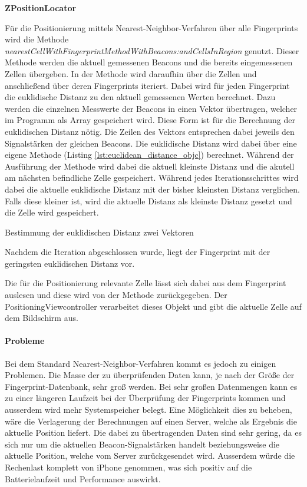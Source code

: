 \textbf{ZPositionLocator}

Für die Positionierung mittels Nearest-Neighbor-Verfahren über alle Fingerprints wird die Methode \emph{nearestCellWithFingerprintMethodWithBeacons:andCellsInRegion} genutzt.
Dieser Methode werden die aktuell gemessenen Beacons und die bereits eingemessenen Zellen übergeben. 
In der Methode wird daraufhin über die Zellen und anschließend über deren Fingerprints iteriert. Dabei wird für jeden Fingerprint die euklidische Distanz zu den aktuell gemessenen Werten berechnet. Dazu werden die einzelnen Messwerte der Beacons in einen Vektor übertragen, welcher im Programm als Array gespeichert wird. Diese Form ist für die Berechnung der euklidischen Distanz nötig. 
Die Zeilen des Vektors entsprechen dabei jeweils den Signalstärken der gleichen Beacons. 
Die euklidische Distanz wird dabei über eine eigene Methode (Listing \ref{lst:euclidean_distance_objc}) berechnet.
Während der Ausführung der Methode wird dabei die aktuell kleinste Distanz und die akutell am nächsten befindliche Zelle gespeichert.
Während jedes Iterationsschrittes wird dabei die aktuelle euklidische Distanz mit der bisher kleinsten Distanz verglichen. Falls diese kleiner ist, wird die aktuelle Distanz als kleinste Distanz gesetzt und die Zelle wird gespeichert.


\begin{listing}[htb!]
    \caption{Bestimmung der euklidischen Distanz zwei Vektoren}
	\label{lst:euclidean_distance_objc}
\end{listing}


Nachdem die Iteration abgeschlossen wurde, liegt der Fingerprint mit der geringsten euklidischen Distanz vor. 

Die für die Positionierung relevante Zelle lässt sich dabei aus dem Fingerprint auslesen und diese wird von der Methode zurückgegeben.
Der PositioningViewcontroller verarbeitet dieses Objekt und gibt die aktuelle Zelle auf dem Bildschirm aus.

\paragraph{Probleme}
\label{sec:implementation:fingerprinting:positioning:naiv:problems}
Bei dem Standard Nearest-Neighbor-Verfahren kommt es jedoch zu einigen Problemen. 
Die Masse der zu überprüfenden Daten kann, je nach der Größe der Fingerprint-Datenbank, sehr groß werden. Bei sehr großen Datenmengen kann es zu einer längeren Laufzeit bei der Überprüfung der Fingerprints kommen und ausserdem wird mehr Systemspeicher belegt. 
Eine Möglichkeit dies zu beheben, wäre die Verlagerung der Berechnungen auf einen Server, welche als Ergebnis die aktuelle Position liefert. Die dabei zu übertragenden Daten sind sehr gering, da es sich nur um die aktuellen Beacon-Signalstärken handelt beziehungsweise die aktuelle Position, welche vom Server zurückgesendet wird. 
Ausserdem würde die Rechenlast komplett von iPhone genommen, was sich positiv auf die Batterielaufzeit und Performance auswirkt.

